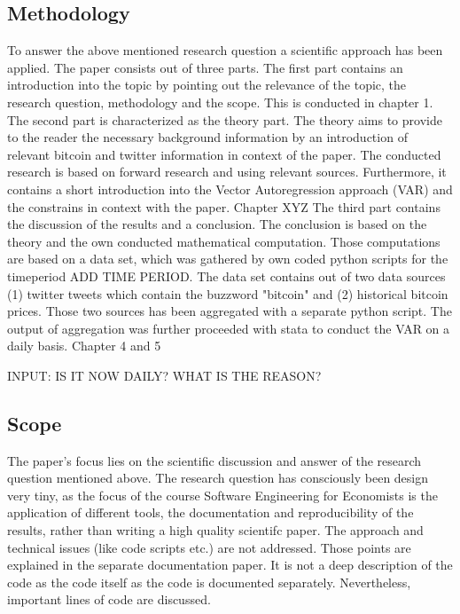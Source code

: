 \documentclass[a4paper,american,12pt]{article}
\begin{document}
\begin{spacing}{1.2}
\subsection{Methodology}
To answer the above mentioned research question a scientific approach has been applied. The paper consists out of three parts. The first part contains an introduction into the topic by pointing out the relevance of the topic, the research question, methodology and the scope. This is conducted in chapter 1. The second part is characterized as the theory part. The theory aims to provide to the reader the necessary background information by an introduction of relevant bitcoin and twitter information in context of the paper. The conducted research is based on forward research and using relevant sources. Furthermore, it contains a short introduction into the Vector Autoregression approach (VAR) and the constrains in context with the paper. Chapter XYZ The third part contains the discussion of the results and a conclusion. The conclusion is based on the theory and the own conducted mathematical computation. Those computations are based on a data set, which was gathered by own coded python scripts for the timeperiod ADD TIME PERIOD. The data set contains out of two data sources (1) twitter tweets which contain the buzzword "bitcoin" and (2) historical bitcoin prices. Those two sources has been aggregated with a separate python script. The output of aggregation was further proceeded with stata to conduct the VAR on a daily basis. Chapter 4 and 5

INPUT: IS IT NOW DAILY? WHAT IS THE REASON?

\subsection{Scope}
The paper's focus lies on the scientific discussion and answer of the research question mentioned above. The research question has consciously been design very tiny, as the focus of the course Software Engineering for Economists is the application of different tools, the documentation and reproducibility of the results, rather than writing a high quality scientifc paper. The approach and technical issues (like code scripts etc.) are not addressed. Those points are explained in the separate documentation paper. It is not a deep description of the code as the code itself as the code is documented separately. Nevertheless, important lines of code are discussed. 
	
\clearpage
		

\end{spacing}
\end{document}
